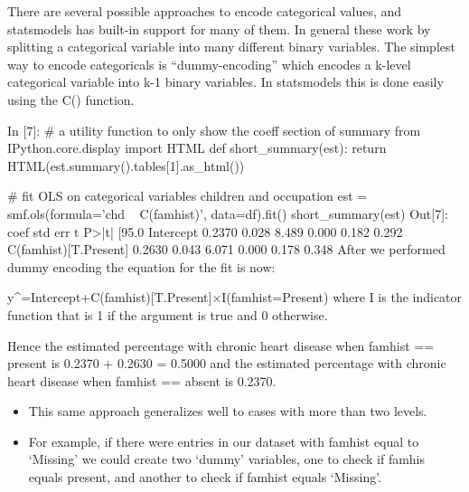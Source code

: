 \begin{frame}[fragile]
	\Large
	There are several possible approaches to encode categorical values, and statsmodels has built-in support for many of them. In general these work by splitting a categorical variable into many different binary variables. The simplest way to encode categoricals is “dummy-encoding” which encodes a k-level categorical variable into k-1 binary variables. In statsmodels this is done easily using the C() function.
\end{frame}

\begin{frame}[fragile]
	\Large
In [7]:
# a utility function to only show the coeff section of summary
from IPython.core.display import HTML
def short_summary(est):
    return HTML(est.summary().tables[1].as_html())

# fit OLS on categorical variables children and occupation
est = smf.ols(formula='chd ~ C(famhist)', data=df).fit()
short_summary(est)
Out[7]:
coef	std err	t	P>|t|	[95.0%
Intercept	0.2370	0.028	8.489	0.000	0.182 0.292
C(famhist)[T.Present]	0.2630	0.043	6.071	0.000	0.178 0.348
After we performed dummy encoding the equation for the fit is now:

y^=Intercept+C(famhist)[T.Present]×I(famhist=Present)
where I is the indicator function that is 1 if the argument is true and 0 otherwise.
\end{frame}

\begin{frame}[fragile]
	\Large
Hence the estimated percentage with chronic heart disease when famhist == present is 0.2370 + 0.2630 = 0.5000 and the estimated percentage with chronic heart disease when famhist == absent is 0.2370.
\end{frame}

\begin{frame}[fragile]
	\Large
	\begin{itemize}
	\item This same approach generalizes well to cases with more than two levels. 
	\item For example, if there were entries in our dataset with famhist equal to ‘Missing’ we could create two ‘dummy’ variables, one to check if famhis equals present, and another to check if famhist equals ‘Missing’.
	\end{itemize}

\end{frame}

